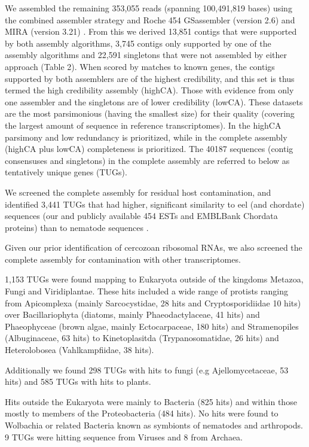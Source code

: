 \documentclass[10pt]{bmc_article}
\newenvironment{bmcformat}{\begin{raggedright}\baselineskip20pt\sloppy\setboolean{publ}{false}}{\end{raggedright}\baselineskip20pt\sloppy}
\begin{document}
\begin{bmcformat}
We assembled the remaining 353,055 reads
(spanning 100,491,819 bases) using the combined assembler
strategy \cite{pmid20950480} and Roche 454 GSassembler (version 2.6)
and MIRA (version 3.21) \cite{miraEST}. From this we derived
13,851 contigs that were supported by both assembly
algorithms, 3,745 contigs only supported by one of the
assembly algorithms and 22,591 singletons that were not
assembled by either approach (Table 2). When scored by matches to
known genes, the contigs supported by both assemblers are of the
highest credibility, and this set is thus termed the high credibility
assembly (highCA). Those with evidence from only one assembler and the
singletons are of lower credibility (lowCA). These datasets are the
most parsimonious (having the smallest size) for their quality
(covering the largest amount of sequence in reference
transcriptomes). In the highCA parsimony and low redundancy is
prioritized, while in the complete assembly (highCA plus lowCA)
completeness is prioritized. The 40187 sequences (contig consensuses
and singletons) in the complete assembly are referred to below as
tentatively unique genes (TUGs).




We screened the complete assembly for residual host contamination, and
identified 3,441 TUGs that had higher, significant
similarity to eel (and chordate) sequences (our and publicly available
454 ESTs and EMBLBank Chordata proteins) than to nematode sequences
\cite{pmid21550347}.

Given our prior identification of cercozoan ribosomal RNAs, we also
screened the complete assembly for contamination with other
transcriptomes.

1,153 TUGs were found mapping to Eukaryota outside of the kingdoms
Metazoa, Fungi and Viridiplantae. These hits included a wide range of
protists ranging from Apicomplexa (mainly Sarcocystidae, 28 hits and
Cryptosporidiidae 10 hits) over Bacillariophyta (diatoms, mainly
Phaeodactylaceae, 41 hits) and Phaeophyceae (brown algae, mainly
Ectocarpaceae, 180 hits) and Stramenopiles (Albuginaceae, 63 hits) to
Kinetoplasitda (Trypanosomatidae, 26 hits) and Heterolobosea
(Vahlkampfiidae, 38 hits).

Additionally we found 298 TUGs with hits
to fungi (e.g Ajellomycetaceae, 53 hits) and
585 TUGs with hits to plants.

Hits outside the Eukaryota were mainly to Bacteria (825 hits) and
within those mostly to members of the Proteobacteria (484 hits). No
hits were found to Wolbachia or related Bacteria known as symbionts of
nematodes and arthropods. 9 TUGs were hitting sequence from Viruses and
8 from Archaea.


\end{bmcformat}
\end{document}
